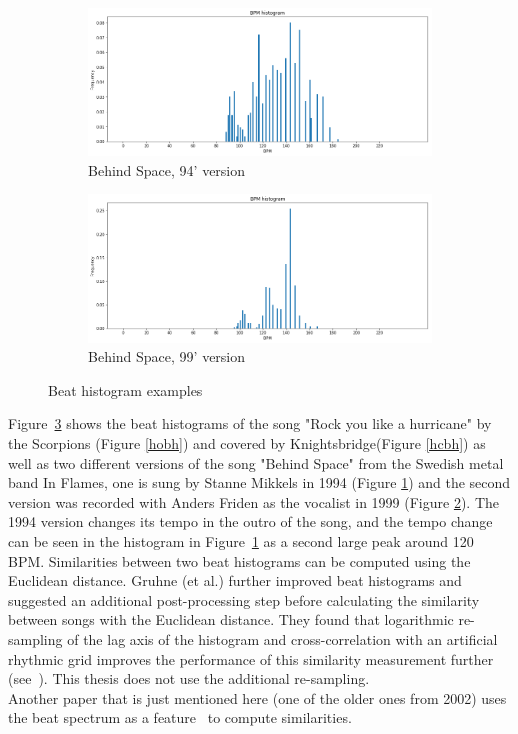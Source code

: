\begin{figure}[htbp]
{{			\begin{subfigure}{.495\textwidth}
				\centering
				\includegraphics[scale=0.25]{Images/Beat/s_s_bh.png}
				\caption{Behind Space, 94' version}
				\label{ssbh}
			\end{subfigure}%
			\begin{subfigure}{.495\textwidth}
				\centering
				\includegraphics[scale=0.25]{Images/Beat/s_a_bh.png}
				\caption{Behind Space, 99' version}
				\label{sabh}
			\end{subfigure}%
	}}
	\caption{Beat histogram examples}
	\label{fig:bh1}
\end{figure}
\noindent Figure~\ref{fig:bh1} shows the beat histograms of the song "Rock you like a hurricane" by the Scorpions (Figure \ref{hobh}) and covered by Knightsbridge(Figure \ref{hcbh}) as well as two different versions of the song "Behind Space" from the Swedish metal band In Flames, one is sung by Stanne Mikkels in 1994 (Figure \ref{ssbh}) and the second version was recorded with Anders Friden as the vocalist in 1999 (Figure \ref{sabh}). The 1994 version changes its tempo in the outro of the song, and the tempo change can be seen in the histogram in Figure~\ref{ssbh} as a second large peak around 120 BPM.
Similarities between two beat histograms can be computed using the Euclidean distance. 
\noindent Gruhne (et al.) further improved beat histograms and suggested an additional post-processing step before calculating the similarity between songs with the Euclidean distance. They found that logarithmic re-sampling of the lag axis of the histogram and cross-correlation with an artificial rhythmic grid improves the performance of this similarity measurement further (see~\cite[182]{rbh1}). This thesis does not use the additional re-sampling.\\
\noindent Another paper that is just mentioned here (one of the older ones from 2002) uses the beat spectrum as a feature~\cite{rhythm1} to compute similarities.

